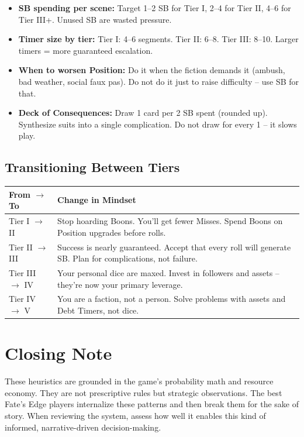 \documentclass[11pt]{article}
\begin{document}
\begin{itemize}
    \item \textbf{SB spending per scene:} Target 1--2 SB for Tier I, 2--4 for Tier II, 4--6 for Tier III+. Unused SB are wasted pressure.
    \item \textbf{Timer size by tier:} Tier I: 4--6 segments. Tier II: 6--8. Tier III: 8--10. Larger timers = more guaranteed escalation.
    \item \textbf{When to worsen Position:} Do it when the fiction demands it (ambush, bad weather, social faux pas). Do not do it just to raise difficulty -- use SB for that.
    \item \textbf{Deck of Consequences:} Draw 1 card per 2 SB spent (rounded up). Synthesize suits into a single complication. Do not draw for every 1 -- it slows play.
\end{itemize}

\subsection*{Transitioning Between Tiers}

\begin{table}[h]
\centering
\begin{tabular}{ll}
\toprule
\textbf{From $\rightarrow$ To} & \textbf{Change in Mindset} \\
\midrule
Tier I $\rightarrow$ II & Stop hoarding Boons. You'll get fewer Misses. Spend Boons on Position upgrades before rolls. \\
Tier II $\rightarrow$ III & Success is nearly guaranteed. Accept that every roll will generate SB. Plan for complications, not failure. \\
Tier III $\rightarrow$ IV & Your personal dice are maxed. Invest in followers and assets -- they're now your primary leverage. \\
Tier IV $\rightarrow$ V & You are a faction, not a person. Solve problems with assets and Debt Timers, not dice. \\
\bottomrule
\end{tabular}
\end{table}

\section*{Closing Note}

These heuristics are grounded in the game's probability math and resource economy. They are not prescriptive rules but strategic observations. The best Fate's Edge players internalize these patterns and then break them for the sake of story. When reviewing the system, assess how well it enables this kind of informed, narrative-driven decision-making.
\end{document}
